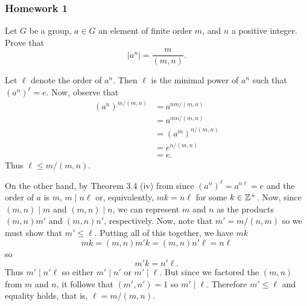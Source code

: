 \newpage

\subsubsection{Homework 1}
\setcounter{exercise}{0}
\begin{problem}
  Let $G$ be a group, $a\in G$ an element of finite order $m$, and $n$ a
  positive integer. Prove that
  \[
    |a^n|=\frac{m}{(m,n)}.
  \]
\end{problem}
\begin{solution}
  Let $\ell$ denote the order of $a^n$. Then $\ell$ is the minimal power of
  $a^n$ such that ${(a^n)}^\ell=e$. Now, observe that
  \begin{equation}
    \label{eq:1:1}
    \begin{aligned}
      {(a^n)}^{m/(m,n)}
      &=a^{nm/(m,n)}\\
      &=a^{mn/(m,n)}\\
      &={(a^m)}^{n/(m,n)}\\
      &=e^{n/(m,n)}\\
      &=e.
    \end{aligned}
  \end{equation}
  Thus $\ell\leq m/(m,n)$.

  On the other hand, by Theorem 3.4 (iv) from \cite[Ch.\@ I \S 3.3, p.\@
  35]{hungerford} since ${(a^n)}^\ell=a^{n\ell}=e$ and the order of $a$ is
  $m$, $m\mid n\ell$ or, equivalently, $mk=n\ell$ for some
  $k\in\mathbb{Z}^+$. Now, since $(m,n)\mid m$ and $(m,n)\mid n$, we can
  represent $m$ and $n$ as the products $(m,n)m'$ and $(m,n)n'$,
  respectively. Now, note that $m'=m/(n,m)$ so we must show that
  $m'\leq\ell$. Putting all of this together, we have $mk$
  \begin{equation}
    \label{eq:1:2}
    mk=(m,n)m'k=(m,n)n'\ell=n\ell
  \end{equation}
  so
  \begin{equation}
    \label{eq:1:3}
    m'k=n'\ell.
  \end{equation}
  Thus $m'\mid n'\ell$ so either $m'\mid n'$ or $m'\mid\ell$. But since we
  factored the $(m,n)$ from $m$ and $n$, it follows that $(m',n')=1$ so
  $m'\mid \ell$. Therefore $m'\leq\ell$ and equality holds, that is,
  $\ell=m/(m,n)$.
\end{solution}

